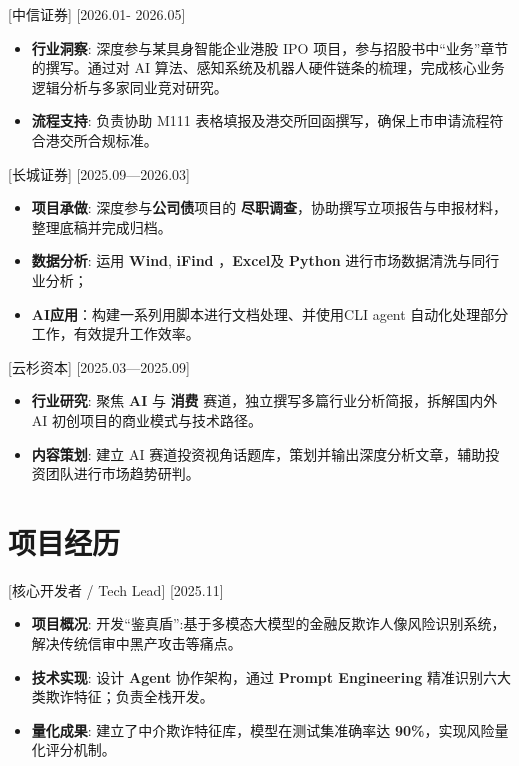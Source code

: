 \documentclass{resume}
\begin{document}
[中信证券]
[2026.01- 2026.05]

\begin{itemize}

\item \textbf{行业洞察}: 深度参与某具身智能企业港股 IPO 项目，参与招股书中“业务”章节的撰写。通过对 AI 算法、感知系统及机器人硬件链条的梳理，完成核心业务逻辑分析与多家同业竞对研究。
\item \textbf{流程支持}: 负责协助 M111 表格填报及港交所回函撰写，确保上市申请流程符合港交所合规标准。

\end{itemize}

[长城证券]  
[2025.09—2026.03]  
\begin{itemize}  
  \item \textbf{项目承做}: 深度参与\textbf{公司债}项目的 \textbf{尽职调查}，协助撰写立项报告与申报材料，整理底稿并完成归档。    
  \item \textbf{数据分析}: 运用 \textbf{Wind}, \textbf{iFind} ，\textbf{Excel}及 \textbf{Python} 进行市场数据清洗与同行业分析；
  \item \textbf{AI应用}：构建一系列用脚本进行文档处理、并使用CLI agent 自动化处理部分工作，有效提升工作效率。  
\end{itemize}

[云杉资本]  
[2025.03—2025.09]  
\begin{itemize}  
  \item \textbf{行业研究}: 聚焦 \textbf{AI} 与 \textbf{消费} 赛道，独立撰写多篇行业分析简报，拆解国内外 AI 初创项目的商业模式与技术路径。  
  \item \textbf{内容策划}: 建立 AI 赛道投资视角话题库，策划并输出深度分析文章，辅助投资团队进行市场趋势研判。  
\end{itemize}

\section{项目经历}

[核心开发者 / Tech Lead]
[2025.11]
\begin{itemize}
\item \textbf{项目概况}: 开发“鉴真盾”:基于多模态大模型的金融反欺诈人像风险识别系统，解决传统信审中黑产攻击等痛点。
\item \textbf{技术实现}: 设计 \textbf{Agent} 协作架构，通过 \textbf{Prompt Engineering} 精准识别六大类欺诈特征；负责全栈开发。
\item \textbf{量化成果}: 建立了中介欺诈特征库，模型在测试集准确率达 \textbf{90\%}，实现风险量化评分机制。
\end{itemize}
\end{document}
